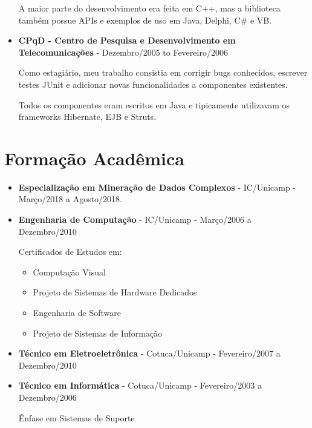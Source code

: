 \documentclass[a4paper,10pt]{article}
\begin{document}
\begin{itemize}
        A maior parte do desenvolvimento era feita em C++, mas a biblioteca também possue APIs e exemplos de uso em Java, Delphi, C\# e VB.

      \item
        \textbf{CPqD - Centro de Pesquisa e Desenvolvimento em Telecomunicações} - Dezembro/2005 to Fevereiro/2006

        Como estagiário, meu trabalho consistia em corrigir bugs conhecidos, escrever testes JUnit e adicionar novas funcionalidades a componentes existentes.

        Todos os componentes eram escritos em Java e tipicamente utilizavam os frameworks Hibernate, EJB e Struts.
    \end{itemize}



  \section{Formação Acadêmica}
    \begin{itemize}

      \item
        \textbf{Especialização em Mineração de Dados Complexos} - IC/Unicamp - Março/2018 a Agosto/2018.

      \item
        \textbf{Engenharia de Computação} - IC/Unicamp - Março/2006 a Dezembro/2010


        Certificados de Estudos em:
        \begin{itemize}
          \item Computação Visual
          \item Projeto de Sistemas de Hardware Dedicados
          \item Engenharia de Software
          \item Projeto de Sistemas de Informação
        \end{itemize}



      \item  
        \textbf{Técnico em Eletroeletrônica} - Cotuca/Unicamp - Fevereiro/2007 a Dezembro/2010


      \item  
        \textbf{Técnico em Informática} - Cotuca/Unicamp - Fevereiro/2003 a Dezembro/2006

        Ênfase em Sistemas de Suporte


    \end{itemize}
\end{document}

